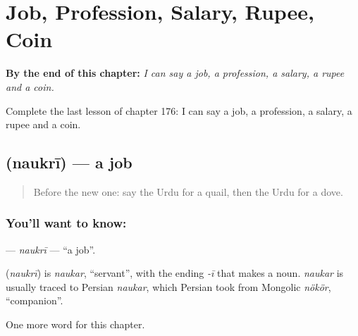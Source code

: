 
\chapter{Job, Profession, Salary, Rupee, Coin}
\label{ch:ur-job-profession-salary-rupee-coin}

\begin{chapteropening}
\textbf{By the end of this chapter:} \emph{I can say a job, a profession, a salary, a rupee and a coin.}

Complete the last lesson of chapter 176: I can say a job, a profession, a salary, a rupee and a coin.
\end{chapteropening}

\section[\texorpdfstring{\ur{نوکری} (naukrī)}{نوکری (naukrī)}]{ (naukrī) — a job}

\label{lesson:UR-C176-naukri}



\begin{quote}
Before the new one: say the Urdu for a quail, then the Urdu for a dove.
\end{quote}

\subsection*{You'll want to know: }
\textbf{} — \emph{naukrī} — \textquotedblleft{}a job\textquotedblright{}.

\begin{cousinweb}
\textbf{} (\emph{naukrī}) is \emph{naukar}, \textquotedblleft{}servant\textquotedblright{}, with the ending \emph{-ī} that makes a noun. \emph{naukar} is usually traced to Persian \emph{naukar}, which Persian took from Mongolic \emph{nökör}, \textquotedblleft{}companion\textquotedblright{}.
\end{cousinweb}

\begin{grammarlens}[title={What you've built}]
One more word for this chapter.
\end{grammarlens}

